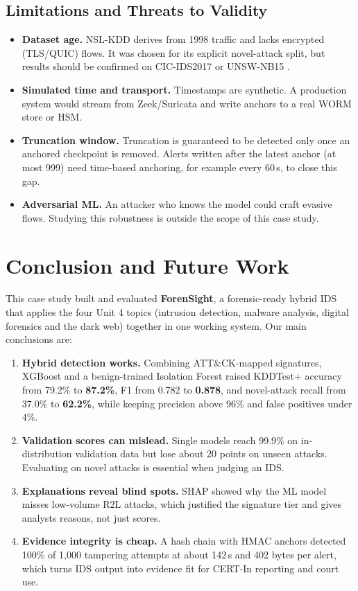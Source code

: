 \documentclass[12pt,a4paper,oneside]{article}
\begin{document}
\subsection{Limitations and Threats to Validity}
\begin{itemize}
  \item \textbf{Dataset age.} NSL-KDD derives from 1998 traffic and lacks encrypted (TLS/QUIC) flows. It was chosen for its explicit novel-attack split, but results should be confirmed on CIC-IDS2017 \cite{sharafaldin2018toward} or UNSW-NB15 \cite{moustafa2015unsw}.
  \item \textbf{Simulated time and transport.} Timestamps are synthetic. A production system would stream from Zeek/Suricata and write anchors to a real WORM store or HSM.
  \item \textbf{Truncation window.} Truncation is guaranteed to be detected only once an anchored checkpoint is removed. Alerts written after the latest anchor (at most 999) need time-based anchoring, for example every 60\,s, to close this gap.
  \item \textbf{Adversarial ML.} An attacker who knows the model could craft evasive flows. Studying this robustness is outside the scope of this case study.
\end{itemize}

\section{Conclusion and Future Work}
This case study built and evaluated \textbf{ForenSight}, a forensic-ready hybrid IDS that applies the four Unit 4 topics (intrusion detection, malware analysis, digital forensics and the dark web) together in one working system. Our main conclusions are:
\begin{enumerate}
  \item \textbf{Hybrid detection works.} Combining ATT\&CK-mapped signatures, XGBoost and a benign-trained Isolation Forest raised KDDTest+ accuracy from 79.2\% to \textbf{87.2\%}, F1 from 0.782 to \textbf{0.878}, and novel-attack recall from 37.0\% to \textbf{62.2\%}, while keeping precision above 96\% and false positives under 4\%.
  \item \textbf{Validation scores can mislead.} Single models reach 99.9\% on in-distribution validation data but lose about 20 points on unseen attacks. Evaluating on novel attacks is essential when judging an IDS.
  \item \textbf{Explanations reveal blind spots.} SHAP showed why the ML model misses low-volume R2L attacks, which justified the signature tier and gives analysts reasons, not just scores.
  \item \textbf{Evidence integrity is cheap.} A hash chain with HMAC anchors detected 100\% of 1{,}000 tampering attempts at about 142\,\textmu s and 402 bytes per alert, which turns IDS output into evidence fit for CERT-In reporting and court use.
\end{enumerate}
\end{document}
